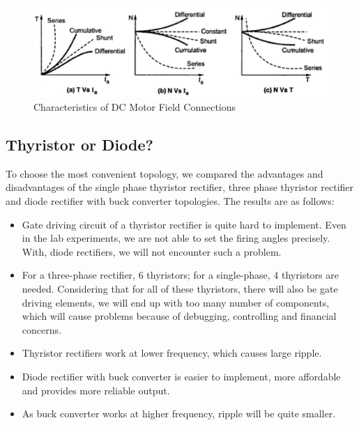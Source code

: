 \documentclass[10pt,a4paper]{article}
\begin{document}
\begin{figure}[!ht]
\centering
\includegraphics[scale=0.7]{char.jpeg} 
\caption{Characteristics of DC Motor Field Connections}
\label{fig:1}
\end{figure}


\subsection*{Thyristor or Diode?}
To choose the most convenient topology, we compared the advantages and disadvantages of the single phase thyristor rectifier, three phase thyristor rectifier and diode rectifier with buck converter topologies. The results are as follows:

\begin{itemize}
\item Gate driving circuit of a thyristor rectifier is quite hard to implement. Even in the lab experiments, we are not able to set the firing angles precisely. With, diode rectifiers, we will not encounter such a problem.
\item For a three-phase rectifier, 6 thyristors; for a single-phase, 4 thyristors are needed. Considering that for all of these thyristors, there will also be gate driving elements, we will end up with too many number of components, which will cause problems because of debugging, controlling and financial concerns.
\item Thyristor rectifiers work at lower frequency, which causes large ripple.
\item Diode rectifier with buck converter is easier to implement, more affordable and provides more reliable output.
\item As buck converter works at higher frequency, ripple will be quite smaller.

\end{itemize}
\end{document}
